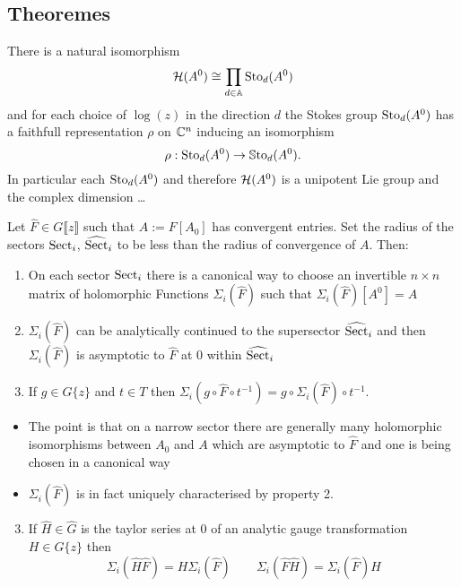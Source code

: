 \subsection{Theoremes}
\begin{thm}
  There is a natural isomorphism
  \[
    \mathcal{H}(A^0)\cong\prod_{d\in\mathbb{A}}\operatorname{Sto}_d(A^0)
  \]
  and for each choice of $\log(z)$ in the direction $d$ the Stokes group
  $\operatorname{Sto}_d(A^0)$ has a faithfull representation $\rho$ on $\mathbb{C}^n$ inducing an
  isomorphism
  \[
    \rho:\operatorname{Sto}_d(A^0)\to\operatorname{\mathbb{S}to}_d(A^0).
  \]
  In particular each $\operatorname{Sto}_d(A^0)$ and therefore $\mathcal{H}(A^0)$ is a unipotent Lie
  group and the complex dimension \dots
\end{thm}
\begin{thm}
  Let $\hat{F}\in G\llbracket z\rrbracket$ such that $A:=F[A_0]$ has
  convergent entries.
  Set the radius of the sectors $\operatorname{Sect}_i$, $\widehat{\operatorname{Sect}}_i$ to be less than
  the radius of convergence of $A$.
  Then:
  \begin{enumerate}
    \item On each sector $\operatorname{Sect}_i$ there is a canonical way to choose an
      invertible $n\times n$ matrix of holomorphic Functions
      $\Sigma_i(\hat F)$ such that $\Sigma_i(\hat F)[A^0]=A$
    \item $\Sigma_i(\hat F)$ can be analytically continued to the supersector
      $\widehat{\operatorname{Sect}}_i$ and then $\Sigma_i(\hat F)$ is asymptotic to $\hat F$
      at $0$ within $\widehat{\operatorname{Sect}}_i$
    \item If $g\in G\{z\}$ and $t\in T$ then
      $\Sigma_i(g\circ\hat F \circ t^{-1})=g\circ\Sigma_i(\hat F)\circ t^{-1}$.
  \end{enumerate}
  \begin{rem}
    \begin{itemize}
      \item The point is that on a narrow sector there are generally many
        holomorphic isomorphisms between $A_0$ and $A$ which are asymptotic to
        $\hat F$ and one is being chosen in a canonical way
      \item $\Sigma_i(\hat F)$ is in fact uniquely characterised by property 2.
    \end{itemize}
  \end{rem}
\end{thm}
\begin{prop}
  \begin{enumerate}
  \setcounter{enumi}{2}
  \item If $\hat H\in\hat G$ is the taylor series at $0$ of an analytic gauge
    transformation $H\in G\{z\}$ then
    \[
      \Sigma_i(\hat H \hat F)=H\Sigma_i(\hat F)
      \qquad
      \Sigma_i(\hat F \hat H)=\Sigma_i(\hat F)H
    \]
  \end{enumerate}
\end{prop}
